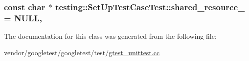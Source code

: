 \subsubsection[{\texorpdfstring{shared\+\_\+resource\+\_\+}{shared_resource_}}]{\setlength{\rightskip}{0pt plus 5cm}const char $\ast$ testing\+::\+Set\+Up\+Test\+Case\+Test\+::shared\+\_\+resource\+\_\+ = N\+U\+LL\hspace{0.3cm}{\ttfamily [static]}, {\ttfamily [protected]}}\hypertarget{classtesting_1_1SetUpTestCaseTest_a904e77fd9a628b6a9aca0280665fd040}{}\label{classtesting_1_1SetUpTestCaseTest_a904e77fd9a628b6a9aca0280665fd040}


The documentation for this class was generated from the following file\+:\begin{DoxyCompactItemize}
\item 
vendor/googletest/googletest/test/\hyperlink{gtest__unittest_8cc}{gtest\+\_\+unittest.\+cc}\end{DoxyCompactItemize}

